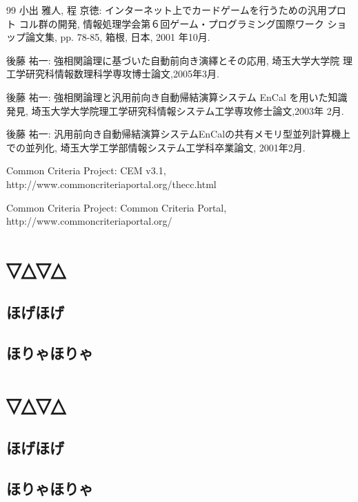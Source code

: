 \documentclass[12pt,epsf,dvipdfmx]{jreport}
\begin{document}
\begin{thebibliography}{99}
小出 雅人, 程 京徳: インターネット上でカードゲームを行うための汎用プロト
        コル群の開発, 情報処理学会第６回ゲーム・プログラミング国際ワーク
        ショップ論文集, pp. 78-85, 箱根, 日本, 2001 年10月.

後藤 祐一: 強相関論理に基づいた自動前向き演繹とその応用, 埼玉大学大学院
	理工学研究科情報数理科学専攻博士論文,2005年3月.

後藤 祐一: 強相関論理と汎用前向き自動帰結演算システム EnCal を用いた知識
	発見, 埼玉大学大学院理工学研究科情報システム工学専攻修士論文,2003年
	2月.

後藤 祐一: 汎用前向き自動帰結演算システムEnCalの共有メモリ型並列計算機上
	での並列化, 埼玉大学工学部情報システム工学科卒業論文, 2001年2月.


{Common Criteria Project}:
\newblock CEM v3.1,
\newblock \\http://www.commoncriteriaportal.org/thecc.html

{Common Criteria Project}:
\newblock Common Criteria Portal,
\newblock \\http://www.commoncriteriaportal.org/

\end{thebibliography}

\appendix %
\chapter{▽△▽△}
\section{ほげほげ}
\section{ほりゃほりゃ}
\chapter{▽△▽△}
\section{ほげほげ}
\section{ほりゃほりゃ}

\printindex

\end{document}
